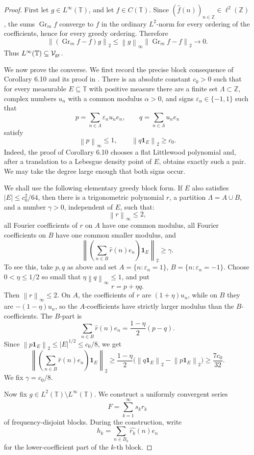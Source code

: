\documentclass[11pt]{article}
\newcommand{\T}{\mathbb T}
\newcommand{\Z}{\mathbb Z}
\newcommand{\eps}{\varepsilon}
\newcommand{\norm}[1]{\left\lVert #1 \right\rVert}
\newcommand{\abs}[1]{\left\lvert #1 \right\rvert}
\newcommand{\one}{\mathbf 1}
\newcommand{\Gr}{\operatorname{Gr}}
\begin{document}
\begin{proof}
First let \(g\in L^\infty(\T)\), and let \(f\in C(\T)\). Since \((\widehat f(n))_{n\in\Z}\in \ell^2(\Z)\), the sums \(\Gr_m f\) converge to \(f\) in the ordinary \(L^2\)-norm for every ordering of the coefficients, hence for every greedy ordering. Therefore
\[
  \norm{(\Gr_m f-f)g}_2
  \le \norm{g}_\infty \norm{\Gr_m f-f}_2
  \longrightarrow 0.
\]
Thus \(L^\infty(\T)\subseteq \mathcal V_{\rm gr}\).

We now prove the converse. We first record the precise block consequence of Corollary 6.10 and its proof in \cite{HHP}. There is an absolute constant \(c_0>0\) such that for every measurable \(E\subseteq \T\) with positive measure there are a finite set \(\Lambda\subset\Z\), complex numbers \(u_n\) with a common modulus \(\alpha>0\), and signs \(\eps_n\in\{-1,1\}\) such that
\[
  p=\sum_{n\in\Lambda}\eps_n u_n e_n,\qquad
  q=\sum_{n\in\Lambda}u_n e_n
\]
satisfy
\[
  \norm{p}_\infty\le 1,
  \qquad
  \norm{q\one_E}_2\ge c_0.
\]
Indeed, the proof of Corollary 6.10 chooses a flat Littlewood polynomial and, after a translation to a Lebesgue density point of \(E\), obtains exactly such a pair. We may take the degree large enough that both signs occur.

We shall use the following elementary greedy block form. If \(E\) also satisfies \(\abs{E}\le c_0^2/64\), then there is a trigonometric polynomial \(r\), a partition \(\Lambda=A\cup B\), and a number \(\gamma>0\), independent of \(E\), such that:
\[
  \norm{r}_\infty\le 2,
\]
all Fourier coefficients of \(r\) on \(A\) have one common modulus, all Fourier coefficients on \(B\) have one common smaller modulus, and
\[
  \norm{\left(\sum_{n\in B}\widehat r(n)e_n\right)\one_E}_2\ge \gamma.
\]
To see this, take \(p,q\) as above and set \(A=\{n:\eps_n=1\}\), \(B=\{n:\eps_n=-1\}\). Choose \(0<\eta\le 1/2\) so small that \(\eta\norm{q}_\infty\le 1\), and put
\[
  r=p+\eta q.
\]
Then \(\norm{r}_\infty\le 2\). On \(A\), the coefficients of \(r\) are \((1+\eta)u_n\), while on \(B\) they are \(-(1-\eta)u_n\), so the \(A\)-coefficients have strictly larger modulus than the \(B\)-coefficients. The \(B\)-part is
\[
  \sum_{n\in B}\widehat r(n)e_n
  =
  \frac{1-\eta}{2}(p-q).
\]
Since \(\norm{p\one_E}_2\le \abs E^{1/2}\le c_0/8\), we get
\[
  \norm{\left(\sum_{n\in B}\widehat r(n)e_n\right)\one_E}_2
  \ge
  \frac{1-\eta}{2}\bigl(\norm{q\one_E}_2-\norm{p\one_E}_2\bigr)
  \ge \frac{7c_0}{32}.
\]
We fix \(\gamma=c_0/8\).

Now fix \(g\in L^2(\T)\setminus L^\infty(\T)\). We construct a uniformly convergent series
\[
  F=\sum_{k=1}^\infty s_k r_k
\]
of frequency-disjoint blocks. During the construction, write
\[
  h_k=\sum_{n\in B_k}\widehat{r_k}(n)e_n
\]
for the lower-coefficient part of the \(k\)-th block.


\end{proof}
\end{document}
